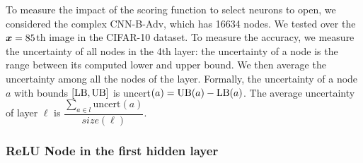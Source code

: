 
To measure the impact of the scoring function to select neurons to open, 
we considered the complex CNN-B-Adv, which has 16634 nodes. 
We tested over the ${\bm{x}}=85$th image in the CIFAR-10 dataset.
To measure the accuracy, we measure the uncertainty of all nodes in the 4th layer:
the uncertainty of a node is the range between its computed lower and upper bound. 
We then average the uncertainty among all the nodes of the layer.
Formally, the uncertainty of a node $a$ with bounds $[\mathrm{LB},\mathrm{UB}]$ is uncert$(a) = \mathrm{UB}(a) - \mathrm{LB}(a)$. The average uncertainty of layer $\ell$ is 
$\dfrac{\sum_{a\in l} \text{uncert}(a)}{size(\ell)}.$






\iffalse

\subsubsection*{ReLU Node in the first hidden layer}


